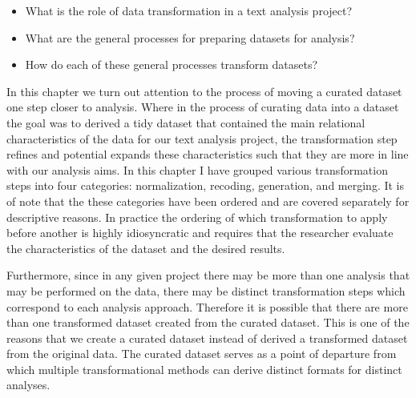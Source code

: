 \documentclass[
  letterpaper,
]{scrbook}
\providecommand{\tightlist}{%
  \setlength{\itemsep}{0pt}\setlength{\parskip}{0pt}}\usepackage{longtable,booktabs,array}
\begin{document}
\begin{tcolorbox}[enhanced jigsaw, title=\textcolor{quarto-callout-note-color}{\faInfo}\hspace{0.5em}{Keys}, breakable, colback=white, colframe=quarto-callout-note-color-frame, bottomrule=.15mm, left=2mm, bottomtitle=1mm, colbacktitle=quarto-callout-note-color!10!white, opacityback=0, arc=.35mm, toprule=.15mm, coltitle=black, leftrule=.75mm, opacitybacktitle=0.6, toptitle=1mm, titlerule=0mm, rightrule=.15mm]

\begin{itemize}
\tightlist
\item
  What is the role of data transformation in a text analysis project?
\item
  What are the general processes for preparing datasets for analysis?
\item
  How do each of these general processes transform datasets?
\end{itemize}

\end{tcolorbox}

In this chapter we turn out attention to the process of moving a curated
dataset one step closer to analysis. Where in the process of curating
data into a dataset the goal was to derived a tidy dataset that
contained the main relational characteristics of the data for our text
analysis project, the transformation step refines and potential expands
these characteristics such that they are more in line with our analysis
aims. In this chapter I have grouped various transformation steps into
four categories: normalization, recoding, generation, and merging. It is
of note that the these categories have been ordered and are covered
separately for descriptive reasons. In practice the ordering of which
transformation to apply before another is highly idiosyncratic and
requires that the researcher evaluate the characteristics of the dataset
and the desired results.

Furthermore, since in any given project there may be more than one
analysis that may be performed on the data, there may be distinct
transformation steps which correspond to each analysis approach.
Therefore it is possible that there are more than one transformed
dataset created from the curated dataset. This is one of the reasons
that we create a curated dataset instead of derived a transformed
dataset from the original data. The curated dataset serves as a point of
departure from which multiple transformational methods can derive
distinct formats for distinct analyses.
\end{document}
